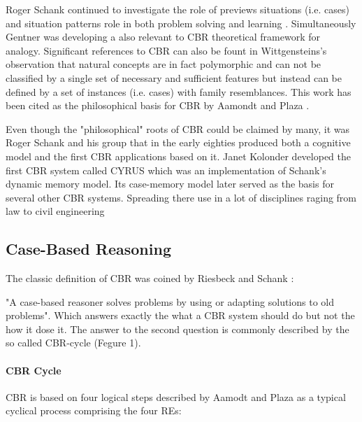 Roger Schank continued to investigate the role of previews situations (i.e. cases) 
and situation patterns role in both problem solving and learning \cite{Schank_1982}. 
Simultaneously Gentner \cite{genter_1983} was developing a also relevant to CBR 
theoretical framework for analogy. Significant references to CBR can also be fount in 
Wittgensteins's observation \cite{wittgestein_1953} that natural concepts are in fact 
polymorphic and can not be classified by a single set of necessary and sufficient 
features but instead can be defined by a set of instances (i.e. cases) with family 
resemblances. This work has been cited as the philosophical basis for CBR by Aamondt and Plaza \cite{aamond_plaza_1994}.

Even though the "philosophical" roots of CBR could be claimed by many, it was Roger Schank and his group that in the early eighties produced both a cognitive model and the first CBR applications based on it. Janet Kolonder developed the first CBR system called CYRUS \cite{kolodner_1983a,kolodner_1983b} which was an implementation of Schank's dynamic memory model. Its case-memory model later served as the basis for several other CBR systems. Spreading there use in a lot of disciplines raging from law \cite{ashley_1988,rissland_skalak_1989} to civil engineering \cite{whatson_abdullah_1994,moore_1994}

\subsection{Case-Based Reasoning}
\label {CBR}  The classic definition of CBR was coined by Riesbeck and Schank \cite{riesbeck_1989}:

"A case-based reasoner solves problems by using or adapting solutions to old problems". 
Which answers exactly the what a CBR system should do but not the how it dose it. The answer 
to the second question is commonly described by the so called CBR-cycle (Fegure 1). 
\paragraph{CBR Cycle}
\label{CBR Cycle} CBR is based on four logical steps described by Aamodt and Plaza 
\cite{aamond_plaza_1994} as a typical cyclical process comprising the four REs: 

